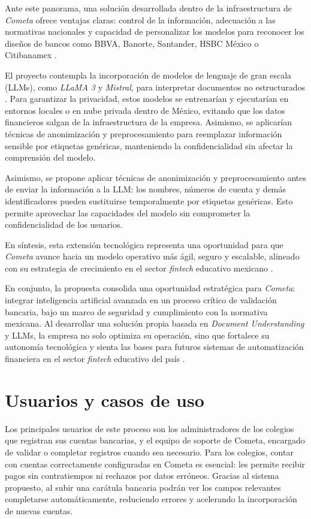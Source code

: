 Ante este panorama, una solución desarrollada dentro de la infraestructura de \textit{Cometa} ofrece ventajas claras: control de la información, adecuación a las normativas nacionales y capacidad de personalizar los modelos para reconocer los diseños de bancos como BBVA, Banorte, Santander, HSBC México o Citibanamex \cite{cometa_inversion}.

El proyecto contempla la incorporación de modelos de lenguaje de gran escala (LLMs), como \textit{LLaMA 3} y \textit{Mistral}, para interpretar documentos no estructurados \cite{llama3,mistral}. Para garantizar la privacidad, estos modelos se entrenarían y ejecutarían en entornos locales o en nube privada dentro de México, evitando que los datos financieros salgan de la infraestructura de la empresa. Asimismo, se aplicarían técnicas de anonimización y preprocesamiento para reemplazar información sensible por etiquetas genéricas, manteniendo la confidencialidad sin afectar la comprensión del modelo.  

Asimismo, se propone aplicar técnicas de anonimización y preprocesamiento antes de enviar la información a la LLM: los nombres, números de cuenta y demás identificadores pueden sustituirse temporalmente por etiquetas genéricas. Esto permite aprovechar las capacidades del modelo sin comprometer la confidencialidad de los usuarios.  

En síntesis, esta extensión tecnológica representa una oportunidad para que \textit{Cometa} avance hacia un modelo operativo más ágil, seguro y escalable, alineado con su estrategia de crecimiento en el sector \textit{fintech} educativo mexicano \cite{cometa_inversion}.

En conjunto, la propuesta consolida una oportunidad estratégica para \textit{Cometa}: integrar inteligencia artificial avanzada en un proceso crítico de validación bancaria, bajo un marco de seguridad y cumplimiento con la normativa mexicana. Al desarrollar una solución propia basada en \textit{Document Understanding} y LLMs, la empresa no solo optimiza su operación, sino que fortalece su autonomía tecnológica y sienta las bases para futuros sistemas de automatización financiera en el sector \textit{fintech} educativo del país \cite{cometa_inversion}.

\section{Usuarios y casos de uso}

Los principales usuarios de este proceso son los administradores de los colegios que registran sus cuentas bancarias, y el equipo de soporte de Cometa, encargado de validar o completar registros cuando sea necesario. Para los colegios, contar con cuentas correctamente configuradas en Cometa es esencial: les permite recibir pagos sin contratiempos ni rechazos por datos erróneos. Gracias al sistema propuesto, al subir una carátula bancaria podrán ver los campos relevantes completarse automáticamente, reduciendo errores y acelerando la incorporación de nuevas cuentas.


